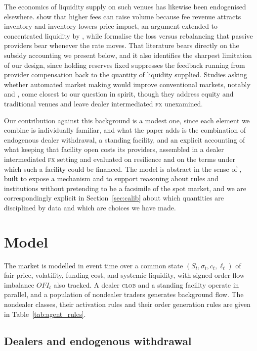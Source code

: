 \documentclass[a4paper,fleqn]{cas-sc}
\newcommand{\acro}[1]{\textsc{\MakeLowercase{#1}}\xspace}
\newcommand{\FX}{\acro{FX}}
\newcommand{\CLOB}{\acro{CLOB}}
\begin{document}
The economics of liquidity supply on such venues has likewise been endogenised elsewhere. \citet{hasbrouck2024dex} show that higher fees can raise volume because fee revenue attracts inventory and inventory lowers price impact, an argument extended to concentrated liquidity by \citet{hasbrouck2025cl}, while \citet{milionis2022} formalise the loss versus rebalancing that passive providers bear whenever the rate moves. That literature bears directly on the subsidy accounting we present below, and it also identifies the sharpest limitation of our design, since holding reserves fixed suppresses the feedback running from provider compensation back to the quantity of liquidity supplied. Studies asking whether automated market making would improve conventional markets, notably \citet{foley2023} and \citet{malinova2023}, come closest to our question in spirit, though they address equity and traditional venues and leave dealer intermediated \FX{} unexamined.

Our contribution against this background is a modest one, since each element we combine is individually familiar, and what the paper adds is the combination of endogenous dealer withdrawal, a standing facility, and an explicit accounting of what keeping that facility open costs its providers, assembled in a dealer intermediated \FX{} setting and evaluated on resilience and on the terms under which such a facility could be financed. The model is abstract in the sense of \citet{gilbert2008}, built to expose a mechanism and to support reasoning about rules and institutions without pretending to be a facsimile of the spot market, and we are correspondingly explicit in Section~\ref{sec:calib} about which quantities are disciplined by data and which are choices we have made.

\section{Model}
\label{sec:model}

The market is modelled in event time over a common state \((S_t,\sigma_t,c_t,\ell_t)\) of fair price, volatility, funding cost, and systemic liquidity, with signed order flow imbalance \(OFI_t\) also tracked. A dealer \CLOB{} and a standing facility operate in parallel, and a population of nondealer traders generates background flow. The nondealer classes, their activation rules and their order generation rules are given in Table~\ref{tab:agent_rules}.

\subsection{Dealers and endogenous withdrawal}
\end{document}
